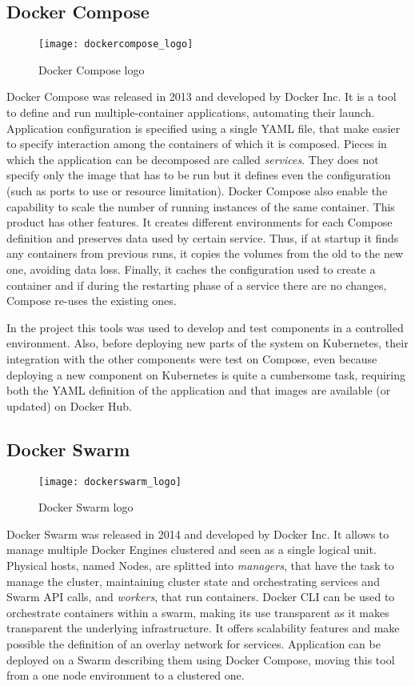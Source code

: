 \subsection{Docker Compose}
\begin{figure}[t]
  \centering \texttt{[image: dockercompose\_logo]}
  \caption{Docker Compose logo}
  \label{chap:intro:img:docker_logo}
\end{figure}
Docker Compose was released in 2013 and developed by Docker Inc. It is a tool
to define and run multiple-container applications, automating their launch.
Application configuration is specified using a single YAML file, that make
easier to specify interaction among the containers of which it is composed.
Pieces in which the application can be decomposed are called
\emph{services}. They does not specify only the image that has to be run but
it defines even the configuration (such as ports to use or resource limitation).
Docker Compose also enable the capability to scale the number of running
instances of the same container. This product has other features. It creates
different environments for each Compose definition and preserves data used by 
certain service. Thus, if at startup it finds any containers from previous runs,
it copies the volumes from the old to the new one, avoiding data loss. Finally,
it caches the configuration used to create a container and if during
the restarting phase of a service there are no changes, Compose re-uses the
existing ones.

In the project this tools was used to develop and test components in a
controlled environment. Also, before deploying new parts of the system on
Kubernetes, their integration with the other components were test on Compose,
even because deploying a new component on Kubernetes is quite a cumbersome task,
requiring both the YAML definition of the application and that images are
available (or updated) on Docker Hub.

\subsection{Docker Swarm}
\begin{figure}[t]
  \centering \texttt{[image: dockerswarm\_logo]}
  \caption{Docker Swarm logo}
  \label{chap:intro:img:docker_logo}
\end{figure}
Docker Swarm was released in 2014 and developed by Docker Inc. It allows to
manage multiple Docker Engines clustered and seen as a single logical unit.
Physical hosts, named Nodes, are splitted into \emph{managers}, that have the
task to manage the cluster, maintaining cluster state and orchestrating services
and Swarm API calls, and \emph{workers}, that run containers. Docker CLI can
be used to orchestrate containers within a swarm, making its use transparent as
it makes transparent the underlying infrastructure. It offers scalability
features and make possible the definition of an overlay network for services.
Application can be deployed on a Swarm describing them using Docker Compose,
moving this tool from a one node environment to a clustered one.


